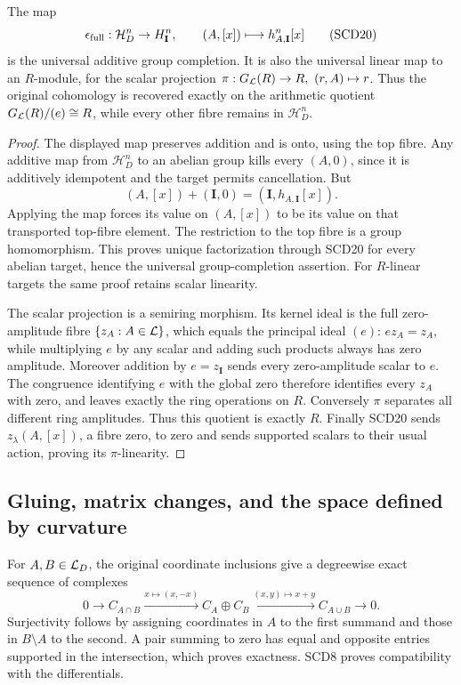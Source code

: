 \begin{theorem}
The map
\[
 \epsilon_{\rm full}:\mathcal H_D^n\to H_{\mathbf I}^n,\qquad
 (A,[x])\longmapsto h_{A,\mathbf I}^n[x]
 \tag{SCD20}
\]
is the universal additive group completion. It is also the universal
linear map to an \(R\)-module, for the scalar projection
\(\pi:G_{\mathcal L}(R)\to R,\ (r,A)\mapsto r\).
Thus the original cohomology is recovered exactly on the arithmetic
quotient \(G_{\mathcal L}(R)/(e)\cong R\), while every other fibre remains
in \(\mathcal H_D^n\).
\end{theorem}
\begin{proof}
The displayed map preserves addition and is onto, using the top
fibre. Any additive map from \(\mathcal H_D^n\) to an abelian group
kills every \((A,0)\), since it is additively idempotent and the
target permits cancellation. But
\[
 (A,[x])+(\mathbf I,0)
 =(\mathbf I,h_{A,\mathbf I}[x]).
\]
Applying the map forces its value on \((A,[x])\) to be its value
on that transported top-fibre element. The restriction to the
top fibre is a group homomorphism. This proves unique factorization
through SCD20 for every abelian target, hence the universal
group-completion assertion. For \(R\)-linear targets the same proof
retains scalar linearity.

The scalar projection is a semiring morphism. Its kernel ideal
is the full zero-amplitude fibre \(\{z_A:A\in\mathcal L\}\), which equals
the principal ideal \((e)\): \(ez_A=z_A\), while multiplying \(e\)
by any scalar and adding such products always has zero amplitude.
Moreover addition by \(e=z_{\mathbf I}\) sends every zero-amplitude
scalar to \(e\). The congruence identifying \(e\) with the global
zero therefore identifies every \(z_A\) with zero, and leaves
exactly the ring operations on \(R\). Conversely \(\pi\) separates
all different ring amplitudes. Thus this quotient is exactly \(R\).
Finally SCD20 sends \(z_\lambda(A,[x])\), a fibre zero, to zero
and sends supported scalars to their usual action, proving its
\(\pi\)-linearity.
\end{proof}

\subsection{Gluing, matrix changes, and the space defined by curvature}

For \(A,B\in\mathcal L_D\), the original coordinate inclusions give
a degreewise exact sequence of complexes
\[
 0\to C_{A\cap B}\xrightarrow{x\mapsto(x,-x)}
 C_A\oplus C_B\xrightarrow{(x,y)\mapsto x+y}C_{A\cup B}\to0 .
 \tag{SCD21}
\]
Surjectivity follows by assigning coordinates in \(A\) to the first
summand and those in \(B\setminus A\) to the second. A pair summing
to zero has equal and opposite entries supported in the intersection,
which proves exactness. SCD8 proves compatibility with the differentials.

